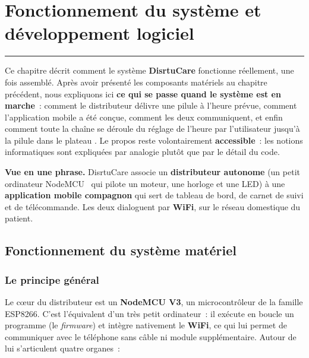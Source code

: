 \documentclass[11pt,a4paper]{report}
\begin{document}
\setcounter{chapter}{2}
\chapter{Fonctionnement du syst\`eme et d\'eveloppement logiciel}

\vspace{-1ex}
{\color{teal}\rule{\linewidth}{1.5pt}}
\vspace{1ex}

Ce chapitre d\'ecrit comment le syst\`eme \textbf{DisrtuCare} fonctionne r\'eellement,
une fois assembl\'e. Apr\`es avoir pr\'esent\'e les composants mat\'eriels au chapitre
pr\'ec\'edent, nous expliquons ici \textbf{ce qui se passe quand le syst\`eme est en
marche}~: comment le distributeur d\'elivre une pilule \`a l'heure pr\'evue, comment
l'application mobile a \'et\'e con\c cue, comment les deux communiquent, et enfin comment
toute la cha\^ine se d\'eroule \og du r\'eglage de l'heure par l'utilisateur jusqu'\`a la
pilule dans le plateau \fg. Le propos reste volontairement \textbf{accessible}~: les
notions informatiques sont expliqu\'ees par analogie plut\^ot que par le d\'etail du code.

\begin{infobox}
\textbf{Vue en une phrase.} DisrtuCare associe un \textbf{distributeur autonome} (un petit
ordinateur \og NodeMCU \fg\ qui pilote un moteur, une horloge et une LED) \`a une
\textbf{application mobile compagnon} qui sert de tableau de bord, de carnet de suivi et de
t\'el\'ecommande. Les deux dialoguent par \textbf{WiFi}, sur le r\'eseau domestique du patient.
\end{infobox}

\section{Fonctionnement du syst\`eme mat\'eriel}

\subsection{Le principe g\'en\'eral}

Le c\oe ur du distributeur est un \textbf{NodeMCU V3}, un microcontr\^oleur de la famille
ESP8266. C'est l'\'equivalent d'un tr\`es petit ordinateur~: il ex\'ecute en boucle un
programme (le \emph{firmware}) et int\`egre nativement le \textbf{WiFi}, ce qui lui permet
de communiquer avec le t\'el\'ephone sans c\^able ni module suppl\'ementaire. Autour de lui
s'articulent quatre organes~:
\end{document}
